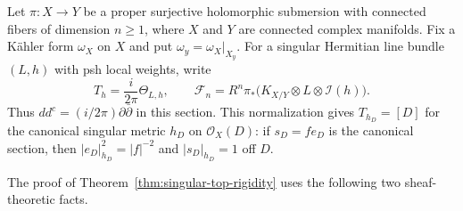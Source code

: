 \documentclass[11pt,reqno]{amsart}
\numberwithin{equation}{section}
\theoremstyle{definition}
\theoremstyle{remark}
\begin{document}
Let $\pi:X\to Y$ be a proper surjective holomorphic submersion with
connected fibers of dimension $n\geq1$, where $X$ and $Y$ are connected
complex manifolds. Fix a K\"ahler form $\omega_X$ on $X$ and put
$\omega_y=\omega_X|_{X_y}$. For a singular Hermitian line bundle $(L,h)$
with psh local weights, write
\[
 T_h=\frac{i}{2\pi}\Theta_{L,h},\qquad
 \mathcal F_n=R^n\pi_*
   \bigl(K_{X/Y}\otimes L\otimes\mathcal I(h)\bigr).
\]
Thus $dd^c=(i/2\pi)\partial\bar\partial$ in this section.
This normalization gives $T_{h_D}=[D]$ for the canonical singular
metric $h_D$ on $\mathcal O_X(D)$: if $s_D=f e_D$ is the canonical
section, then $|e_D|_{h_D}^2=|f|^{-2}$ and $|s_D|_{h_D}=1$ off $D$.

The proof of Theorem~\ref{thm:singular-top-rigidity} uses the
following two sheaf-theoretic facts.
\end{document}
